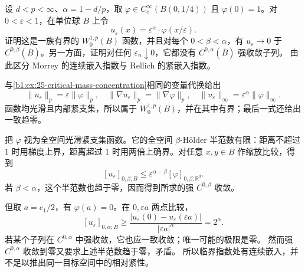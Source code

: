 \begin{exercise}\label{b1:ex:25-holder-endpoint}
设 \(d<p<\infty\)、\(\alpha=1-d/p\)，取
\(\varphi\in C_c^\infty(B(0,1/4))\) 且 \(\varphi(0)=1\)。对
\(0<\varepsilon<1\)，在单位球 \(B\) 上令
\[
 u_\varepsilon(x)=\varepsilon^\alpha\cdot \varphi(x/\varepsilon).
\]
证明这是一族有界的 \(W_0^{1,p}(B)\) 函数，并且对每个
\(0<\beta<\alpha\)，有 \(u_\varepsilon\to0\) 于
\(C^{0,\beta}(\overline B)\)。另一方面，证明对任何
\(\varepsilon_n\downarrow0\)，它都没有 \(C^{0,\alpha}(\overline B)\) 强收敛子列。
由此区分 Morrey 的连续嵌入指数与 Rellich 的紧嵌入指数。
\end{exercise}
\begin{solution}
与\cref{b1:ex:25-critical-mass-concentration}相同的变量代换给出
\[
 \|u_\varepsilon\|_p=\varepsilon\|\varphi\|_p,
 \quad
 \|\nabla u_\varepsilon\|_p=\|\nabla\varphi\|_p,
 \quad
 \|u_\varepsilon\|_\infty=\varepsilon^\alpha\|\varphi\|_\infty.
\]
函数均光滑且内部紧支集，所以属于 \(W_0^{1,p}(B)\)，并在其中有界；最后一式还给出一致趋零。

把 \(\varphi\) 视为全空间光滑紧支集函数。它的全空间
\(\beta\)-Hölder 半范数有限：距离不超过 \(1\) 时用梯度上界，距离超过 \(1\) 时用两倍上确界。对任意 \(x,y\in B\) 作缩放比较，得到
\[
 [u_\varepsilon]_{0,\beta;\overline B}
     \le\varepsilon^{\alpha-\beta}
                   [\varphi]_{0,\beta;\mathbb R^d}.
\]
若 \(\beta<\alpha\)，这个半范数也趋于零，因而得到所求的强
\(C^{0,\beta}\) 收敛。

但取 \(a=e_1/2\)，有 \(\varphi(a)=0\)。在 \(0,\varepsilon a\) 两点比较，
\[
 [u_\varepsilon]_{0,\alpha;\overline B}
 \ge\frac{|u_\varepsilon(0)-u_\varepsilon(\varepsilon a)|}
             {|\varepsilon a|^\alpha}
 =2^\alpha.
\]
若某个子列在 \(C^{0,\alpha}\) 中强收敛，它也应一致收敛；唯一可能的极限是零。
然而强 \(C^{0,\alpha}\) 收敛到零又要求上述半范数趋于零，矛盾。
所以临界指数处有连续嵌入，并不足以推出同一目标空间中的相对紧性。
\end{solution}

